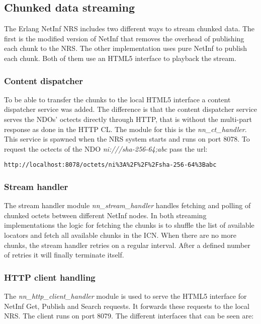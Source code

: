 \subsection{Chunked data streaming}
\label{sec:Chunkeddata}
The Erlang NetInf NRS includes two different ways to stream chunked data. The first is the modified version of NetInf that removes the overhead of publishing each chunk to the NRS. The other implementation uses pure NetInf to publish each chunk. Both of them use an HTML5 interface to playback the stream. 


\subsubsection{Content dispatcher}

To be able to transfer the chunks to the local HTML5 interface a content dispatcher service was added. The difference is that the content dispatcher service serves the NDOs' octects directly through HTTP, that is without the multi-part response as done in the HTTP CL. The module for this is the \textit{nn\_ct\_handler}. This service is spawned when the NRS system starts and runs on port 8078. To request the octects of the NDO \textit{ni:///sha-256-64;abc} pass the url:
\begin{verbatim}
http://localhost:8078/octets/ni%3A%2F%2F%2Fsha-256-64%3Babc 
\end{verbatim}

\subsubsection{Stream handler}
The stream handler module \textit{nn\_stream\_handler} handles fetching and polling of chunked octets between different NetInf nodes.
In both streaming implementations the logic for fetching the chunks is to shuffle the list of available locators and fetch all available chunks in the ICN. When there are no more chunks, the stream handler retries on a regular interval. After a defined number of retries it will finally terminate itself.  

\subsubsection{HTTP client handling}
The \textit{nn\_http\_client\_handler} module is used to serve the HTML5 interface for NetInf Get, Publish and Search requests. It forwards these requests to the local NRS. The client runs on port 8079. The different interfaces that can be seen are:

